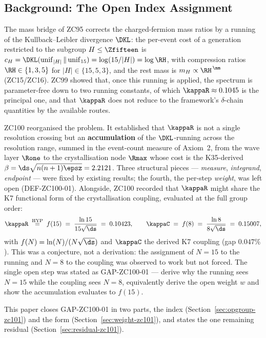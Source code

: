 \documentclass[12pt, a4paper]{article}
\begin{document}
\subsection{Background: The Open Index Assignment}
The mass bridge of ZC95 corrects the charged-fermion mass ratios by a running
of the Kullback--Leibler divergence $\DKL$: the per-event cost of a generation
restricted to the subgroup $H\le\Zfifteen$ is
$c_H=\DKL(\mathrm{unif}_{|H|}\,\|\,\mathrm{unif}_{15})=\log(15/|H|)=\log\RH$,
with compression ratios $\RH\in\{1,3,5\}$ for $|H|\in\{15,5,3\}$, and the rest
mass is $m_H\propto\RH^{\,\nm}$ (ZC15/ZC16). ZC99 showed that, once this running
is applied, the spectrum is parameter-free down to two running constants, of
which $\kappaR\approx0.1045$ is the principal one, and that $\kappaR$ does not
reduce to the framework's $\delta$-chain quantities by the available routes.

ZC100 reorganised the problem. It established that $\kappaR$ is not a single
resolution crossing but an \textbf{accumulation} of the $\DKL$-running across
the resolution range, summed in the event-count measure of Axiom~2, from the
wave layer $\Rone$ to the crystallisation node $\Rmax$ whose cost is the
K35-derived $\beta=\ds\sqrt{n(n+1)\epsz}=2.2121$. Three structural pieces ---
\emph{measure}, \emph{integrand}, \emph{endpoint} --- were fixed by existing
results; the fourth, the per-step \emph{weight}, was left open
(DEF-ZC100-01). Alongside, ZC100 recorded that $\kappaR$ might share the K7
functional form of the crystallisation coupling, evaluated at the full group
order:
\begin{equation}
  \kappaR \;\stackrel{\mathrm{HYP}}{=}\; f(15) \;=\; \frac{\ln 15}{15\sqrt{\ds}}
  \;=\; 0.10423, \qquad
  \kappaC \;=\; f(8) \;=\; \frac{\ln 8}{8\sqrt{\ds}} \;=\; 0.15007,
\end{equation}
with $f(N)=\ln(N)/(N\sqrt{\ds})$ and $\kappaC$ the derived K7 coupling (gap
$0.047\%$). This was a conjecture, not a derivation: the assignment of $N=15$ to
the running and $N=8$ to the coupling was observed to work but not forced. The
single open step was stated as GAP-ZC100-01 --- derive why the running sees
$N=15$ while the coupling sees $N=8$, equivalently derive the open weight $w$
and show the accumulation evaluates to $f(15)$.

This paper closes GAP-ZC100-01 in two parts, the index
(Section~\ref{sec:opgroup-zc101}) and the form (Section~\ref{sec:weight-zc101}), and states
the one remaining residual (Section~\ref{sec:residual-zc101}).
\end{document}
